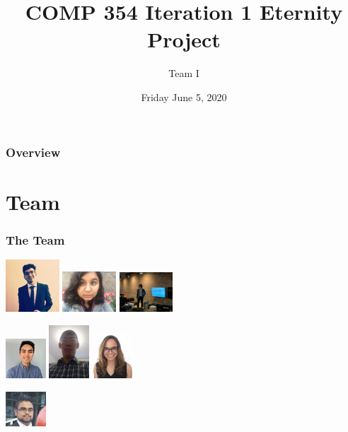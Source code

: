 \documentclass{beamer}
\title{COMP 354 Iteration 1 Eternity Project}
\author
{
Team I
}
\institute{Concordia University}
\date{Friday June 5, 2020}
\begin{document}
\frame{\titlepage}

\begin{frame}
\frametitle{Overview}
\tableofcontents
\end{frame}

\section{Team}




\begin{frame}
\frametitle{The Team}
  \hfil\hfil\includegraphics[width=2cm]{Avnish}
  \hfil\hfil
    \includegraphics[width=2cm]{Swati}
    \hfil\hfil
    \includegraphics[width=2cm]{Emanuel}
    \newline
  \null\hfil\hfil{}
    \hfil\hfil{}  
     \hfil\hfil{} 
    
    \bigskip
    
  \hfil\hfil\includegraphics[width=1.5cm]{Clement}
  \hfil\hfil
    \includegraphics[width=1.5cm]{Nguyen}
    \hfil\hfil
    \includegraphics[width=1.5cm]{Tara}
    \newline
  \null\hfil\hfil{}
    \hfil\hfil{}  
     \hfil\hfil{} 
     \bigskip
      \bigskip
      
           \hfil\hfil\includegraphics[width=1.5cm]{Anik}\newline
  \null\hfil\hfil{}\newline
\end{frame}
\end{document}

